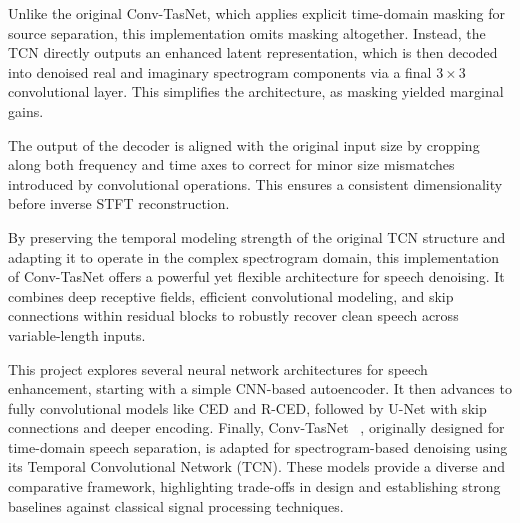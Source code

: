Unlike the original Conv-TasNet, which applies explicit time-domain masking for source separation, this implementation omits masking altogether. Instead, the TCN directly outputs an enhanced latent representation, which is then decoded into denoised real and imaginary spectrogram components via a final \(3 \times 3\) convolutional layer. This simplifies the architecture, as masking yielded marginal gains.

The output of the decoder is aligned with the original input size by cropping along both frequency and time axes to correct for minor size mismatches introduced by convolutional operations. This ensures a consistent dimensionality before inverse STFT reconstruction.

By preserving the temporal modeling strength of the original TCN structure and adapting it to operate in the complex spectrogram domain, this implementation of Conv-TasNet offers a powerful yet flexible architecture for speech denoising. It combines deep receptive fields, efficient convolutional modeling, and skip connections within residual blocks to robustly recover clean speech across variable-length inputs.

\vspace{2em}

This project explores several neural network architectures for speech enhancement, starting with a simple CNN-based autoencoder. It then advances to fully convolutional models like CED and R-CED\~\cite{park2017acoustic}, followed by U-Net with skip connections and deeper encoding. Finally, Conv-TasNet ~\cite{luo2019conv}, originally designed for time-domain speech separation, is adapted for spectrogram-based denoising using its Temporal Convolutional Network (TCN). These models provide a diverse and comparative framework, highlighting trade-offs in design and establishing strong baselines against classical signal processing techniques.


